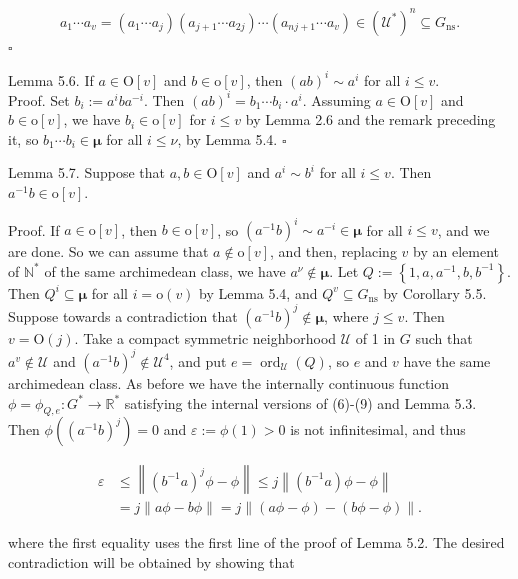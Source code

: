 \documentclass[10pt]{article}
\begin{document}
$$
a_{1} \cdots a_{v}=\left(a_{1} \cdots a_{j}\right)\left(a_{j+1} \cdots a_{2 j}\right) \cdots\left(a_{n j+1} \cdots a_{v}\right) \in\left(\mathcal{U}^{*}\right)^{n} \subseteq G_{\mathrm{ns}} .
$$ \(\square\)

Lemma 5.6. If $a \in \mathrm{O}[v]$ and $b \in \mathrm{o}[v]$, then $(a b)^{i} \sim a^{i}$ for all $i \leq v$.\\
Proof. Set $b_{i}:=a^{i} b a^{-i}$. Then $(a b)^{i}=b_{1} \cdots b_{i} \cdot a^{i}$. Assuming $a \in \mathrm{O}[v]$ and $b \in \mathrm{o}[v]$, we have $b_{i} \in \mathrm{o}[v]$ for $i \leq v$ by Lemma 2.6 and the remark preceding it, so $b_{1} \cdots b_{i} \in \boldsymbol{\mu}$ for all $i \leq \nu$, by Lemma 5.4. \(\square\)

Lemma 5.7. Suppose that $a, b \in \mathrm{O}[v]$ and $a^{i} \sim b^{i}$ for all $i \leq v$. Then $a^{-1} b \in \mathrm{o}[v]$.

Proof. If $a \in \mathrm{o}[v]$, then $b \in \mathrm{o}[v]$, so $\left(a^{-1} b\right)^{i} \sim a^{-i} \in \boldsymbol{\mu}$ for all $i \leq v$, and we are done. So we can assume that $a \notin \mathrm{o}[v]$, and then, replacing $v$ by an element of $\mathbb{N}^{*}$ of the same archimedean class, we have $a^{\nu} \notin \boldsymbol{\mu}$. Let $Q:=\left\{1, a, a^{-1}, b, b^{-1}\right\}$. Then $Q^{i} \subseteq \boldsymbol{\mu}$ for all $i=\mathrm{o}(v)$ by Lemma 5.4, and $Q^{v} \subseteq G_{\mathrm{ns}}$ by Corollary 5.5. Suppose towards a contradiction that $\left(a^{-1} b\right)^{j} \notin \boldsymbol{\mu}$, where $j \leq v$. Then $v=\mathrm{O}(j)$. Take a compact symmetric neighborhood $\mathcal{U}$ of 1 in $G$ such that $a^{v} \notin \mathcal{U}$ and $\left(a^{-1} b\right)^{j} \notin \mathcal{U}^{4}$, and put $e=\operatorname{ord}_{\mathcal{U}}(Q)$, so $e$ and $v$ have the same archimedean class. As before we have the internally continuous function $\phi=\phi_{Q, e}: G^{*} \rightarrow \mathbb{R}^{*}$ satisfying the internal versions of (6)-(9) and Lemma 5.3. Then $\phi\left(\left(a^{-1} b\right)^{j}\right)=0$ and $\varepsilon:=\phi(1)>0$ is not infinitesimal, and thus

$$
\begin{aligned}
\varepsilon & \leq\left\|\left(b^{-1} a\right)^{j} \phi-\phi\right\| \leq j\left\|\left(b^{-1} a\right) \phi-\phi\right\| \\
& =j\|a \phi-b \phi\|=j\|(a \phi-\phi)-(b \phi-\phi)\| .
\end{aligned}
$$

where the first equality uses the first line of the proof of Lemma 5.2. The desired contradiction will be obtained by showing that
\end{document}
